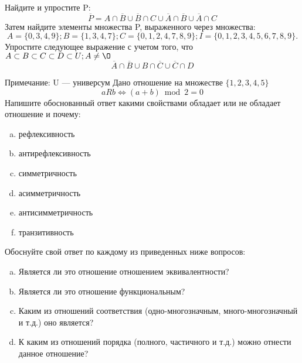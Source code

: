 \documentclass[10pt]{exam}
\begin{document}
\begin{questions}
\question
Найдите и упростите P:
\begin{equation*}
\overline{P} = A \cap \overline{B} \cup \overline{B} \cap C \cup \overline{A} \cap \overline{B} \cup \overline{A} \cap C
\end{equation*}
Затем найдите элементы множества P, выраженного через множества:
\begin{equation*}
A = \{0, 3, 4, 9\}; 
B = \{1, 3, 4, 7\};
C = \{0, 1, 2, 4, 7, 8, 9\};
I = \{0, 1, 2, 3, 4, 5, 6, 7, 8, 9\}.
\end{equation*}\question
Упростите следующее выражение с учетом того, что $A\subset B \subset C \subset D \subset U; A \neq \O$
\begin{equation*}
\overline{A} \cap \overline{B} \cup B \cap \overline{C} \cup \overline{C} \cap D
\end{equation*}

Примечание: U — универсум\question
Дано отношение на множестве $\{1, 2, 3, 4, 5\}$ 
\begin{equation*}
aRb \iff (a+b) \bmod 2 =0
\end{equation*}
Напишите обоснованный ответ какими свойствами обладает или не обладает отношение и почему:   
\begin{enumerate} [a)]\setcounter{enumi}{0}
\item рефлексивность
\item антирефлексивность
\item симметричность
\item асимметричность
\item антисимметричность
\item транзитивность
\end{enumerate}

Обоснуйте свой ответ по каждому из приведенных ниже вопросов:
\begin{enumerate} [a)]\setcounter{enumi}{0}
    \item Является ли это отношение отношением эквивалентности?
    \item Является ли это отношение функциональным?
    \item Каким из отношений соответствия (одно-многозначным, много-многозначный и т.д.) оно является?
    \item К каким из отношений порядка (полного, частичного и т.д.) можно отнести данное отношение?
\end{enumerate}




\end{questions}
\end{document}
